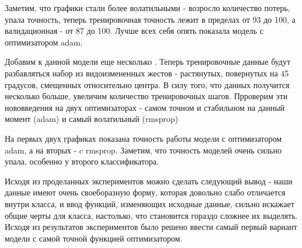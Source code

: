 Заметим, что графики стали более волатильными - возросло количество потерь, упала точность, теперь тренировочная точность лежит в пределах от 93 до 100, а валидационная - от 87 до 100. Лучше всех себя опять показала модель с оптимизатором adam. 

Добавим к данной модели еще несколько . Теперь тренировочные данные будут разбавляться набор из видоизмененных жестов - растянутых, повернутых на 45 градусов, смещенных относительно центра.
В силу того, что данных получится несколько больше, увеличим количество тренировочных шагов.
Прроверим эти нововведения на двух оптимизаторах - самом точном и стабильном на данный момент (adam) и самый волатильный (rmsprop)

\begin{figure}[H]
\end{figure}

На первых двух графиках показана точность работы модели с оптимизатором adam, а на вторых - c rmsprop. Заметим, что точность моделей очень сильно упала, особенно у второго классификатора. 

Исходя из проделанных экспериментов можно сделать следующий вывод - наши данные имеют очень своеборазную форму, которая довольно слабо отличается внутри класса, и ввод функций, изменяющих исходные данные, сильно искажает общие черты для класса, настолько, что становится гораздо сложнее их выделять.
Исходя из результатов экспериментов было решено ввести самый первый вариант модели с самой точной функцией оптимизатором.
